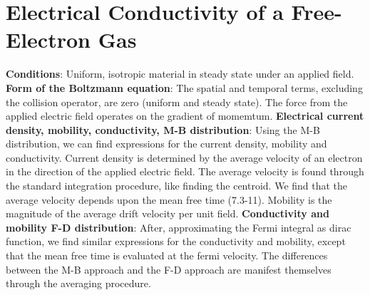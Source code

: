 \documentclass{article}
\numberwithin{equation}{section}
\begin{document}
\section*{Electrical Conductivity of a Free-Electron Gas}
\textbf{Conditions}: Uniform, isotropic material in steady state under an applied field.
\newline
\textbf{Form of the Boltzmann equation}: The spatial and temporal terms, excluding the collision operator, are zero (uniform and steady state). The force from the applied electric field operates on the gradient of momemtum. 
\newline
\textbf{Electrical current density, mobility, conductivity, M-B distribution}: Using the M-B distribution, we can find expressions for the current density, mobility and conductivity.
Current density is determined by the average velocity of an electron in the direction of the applied electric field. The average velocity is found through the standard integration procedure, like finding the centroid. We find that the average velocity depends upon the mean free time (7.3-11). Mobility is the magnitude of the average drift velocity per unit field. 
\newline
\textbf{Conductivity and mobility F-D distribution}: After, approximating the Fermi integral as dirac function, we find similar expressions for the conductivity and mobility, except that the mean free time is evaluated at the fermi velocity. The differences between the M-B approach and the F-D approach are manifest themselves through the averaging procedure. 
\end{document}

